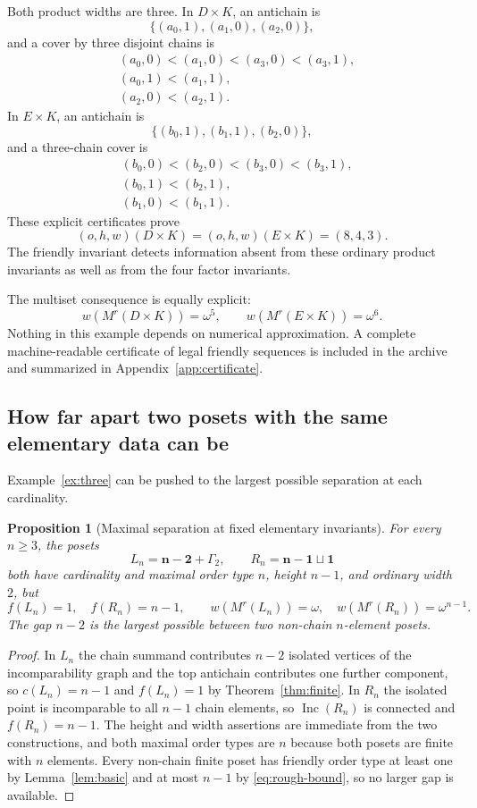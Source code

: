 \documentclass[11pt,letterpaper]{article}
\newtheorem{proposition}[theorem]{Proposition}
\theoremstyle{definition}
\theoremstyle{remark}
\newcommand{\Inc}{\operatorname{Inc}}
\newcommand{\chain}[1]{\mathbf{#1}}
\newcommand{\anti}[1]{\Gamma_{#1}}
\begin{document}
Both product widths are three. In $D\times K$, an antichain is
\[
 \{(a_0,1),(a_1,0),(a_2,0)\},
\]
and a cover by three disjoint chains is
\[
\begin{aligned}
 &(a_0,0)<(a_1,0)<(a_3,0)<(a_3,1),\\
 &(a_0,1)<(a_1,1),\\
 &(a_2,0)<(a_2,1).
\end{aligned}
\]
In $E\times K$, an antichain is
\[
 \{(b_0,1),(b_1,1),(b_2,0)\},
\]
and a three-chain cover is
\[
\begin{aligned}
 &(b_0,0)<(b_2,0)<(b_3,0)<(b_3,1),\\
 &(b_0,1)<(b_2,1),\\
 &(b_1,0)<(b_1,1).
\end{aligned}
\]
These explicit certificates prove
\[
 (o,h,w)(D\times K)=(o,h,w)(E\times K)=(8,4,3).
\]
The friendly invariant detects information absent from these ordinary
product invariants as well as from the four factor invariants.

The multiset consequence is equally explicit:
\[
 w(M^r(D\times K))=\omega^5,
 \qquad
 w(M^r(E\times K))=\omega^6.
\]
Nothing in this example depends on numerical approximation. A complete
machine-readable certificate of legal friendly sequences is included in
the archive and summarized in Appendix~\ref{app:certificate}.

\subsection{How far apart two posets with the same elementary data can be}
Example~\ref{ex:three} can be pushed to the largest possible separation at
each cardinality.

\begin{proposition}[Maximal separation at fixed elementary invariants]\label{prop:separation}
For every $n\ge3$, the posets
\[
 L_n=\chain{n-2}+\anti2,
 \qquad
 R_n=\chain{n-1}\sqcup\chain1
\]
both have cardinality and maximal order type $n$, height $n-1$, and ordinary
width $2$, but
\[
 f(L_n)=1,\quad f(R_n)=n-1,
 \qquad
 w(M^r(L_n))=\omega,\quad w(M^r(R_n))=\omega^{n-1}.
\]
The gap $n-2$ is the largest possible between two non-chain $n$-element
posets.
\end{proposition}
\begin{proof}
In $L_n$ the chain summand contributes $n-2$ isolated vertices of the
incomparability graph and the top antichain contributes one further
component, so $c(L_n)=n-1$ and $f(L_n)=1$ by Theorem~\ref{thm:finite}. In
$R_n$ the isolated point is incomparable to all $n-1$ chain elements, so
$\Inc(R_n)$ is connected and $f(R_n)=n-1$. The height and width assertions
are immediate from the two constructions, and both maximal order types are
$n$ because both posets are finite with $n$ elements. Every non-chain finite
poset has friendly order type at least one by Lemma~\ref{lem:basic} and at
most $n-1$ by \eqref{eq:rough-bound}, so no larger gap is available.
\end{proof}
\end{document}

